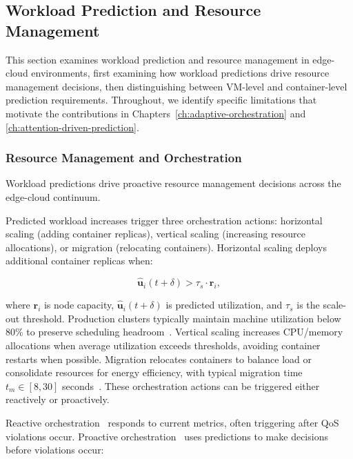 \subsection{Workload Prediction and Resource Management}
\label{sec:ch2_workload_prediction}

This section examines workload prediction and resource management in edge-cloud environments, first examining how workload predictions drive resource management decisions, then distinguishing between \ac{VM}-level and container-level prediction requirements. Throughout, we identify specific limitations that motivate the contributions in Chapters~\ref{ch:adaptive-orchestration} and \ref{ch:attention-driven-prediction}.

\subsubsection{Resource Management and Orchestration}
\label{sec:ch2_resource_mgmt}

Workload predictions drive proactive resource management decisions across the edge-cloud continuum.

Predicted workload increases trigger three orchestration actions: horizontal scaling (adding container replicas), vertical scaling (increasing resource allocations), or migration (relocating containers). Horizontal scaling deploys additional container replicas when:

\begin{equation}
\hat{\mathbf{u}}_i(t+\delta) > \tau_s \cdot \mathbf{r}_i,
\end{equation}

where $\mathbf{r}_i$ is node capacity, $\hat{\mathbf{u}}_i(t+\delta)$ is predicted utilization, and $\tau_s$ is the scale-out threshold. Production clusters typically maintain machine utilization below 80\% to preserve scheduling headroom~\cite{tirmazi2020borg}. Vertical scaling increases \ac{CPU}/memory allocations when average utilization exceeds thresholds, avoiding container restarts when possible. Migration relocates containers to balance load or consolidate resources for energy efficiency, with typical migration time $t_m \in [8, 30]$ seconds~\cite{eskandani2024criu}. These orchestration actions can be triggered either reactively or proactively.

Reactive orchestration~\cite{8258257} responds to current metrics, often triggering after \ac{QoS} violations occur. Proactive orchestration~\cite{farhad2023ai} uses predictions to make decisions before violations occur:

